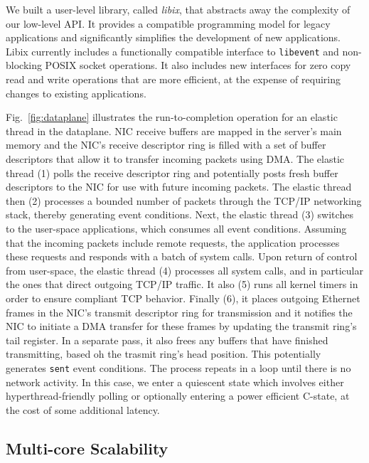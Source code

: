We built a user-level library, called \emph{libix}, that abstracts
away the complexity of our low-level API. It provides a compatible
programming model for legacy applications and significantly simplifies
the development of new applications. Libix currently includes a
functionally compatible interface to \texttt{libevent} and
non-blocking POSIX socket operations. It also includes new interfaces
for zero copy read and write operations that are more efficient, at
the expense of requiring changes to existing applications.


% 

Fig.~\ref{fig:dataplane} illustrates the run-to-completion operation
for an elastic thread in the \ix dataplane. NIC receive buffers are
mapped in the server's main memory and the NIC's receive descriptor
ring is filled with a set of buffer descriptors that allow it to
transfer incoming packets using DMA\@.  The elastic thread (1) polls
the receive descriptor ring and potentially posts fresh buffer
descriptors to the NIC for use with future incoming packets. The
elastic thread then (2) processes a bounded number of packets through
the TCP/IP networking stack, thereby generating event
conditions. Next, the elastic thread (3) switches to the user-space
applications, which consumes all event conditions. Assuming that the
incoming packets include remote requests, the application processes
these requests and responds with a batch of system calls. Upon return
of control from user-space, the elastic thread (4) processes all
system calls, and in particular the ones that direct outgoing TCP/IP
traffic. It also (5) runs all kernel timers in order to ensure
compliant TCP behavior. Finally (6), it places outgoing Ethernet
frames in the NIC's transmit descriptor ring for transmission and it
notifies the NIC to initiate a DMA transfer for these frames by
updating the transmit ring's tail register. In a separate pass, it
also frees any buffers that have finished transmitting, based oh the
trasmit ring's head position. This potentially generates \texttt{sent}
event conditions.  The process repeats in a loop until there is no
network activity. In this case, we enter a quiescent state which
involves either hyperthread-friendly polling or optionally entering a
power efficient C-state, at the cost of some additional latency.


\subsection{Multi-core Scalability}
\label{sec:impl:cohfree}

